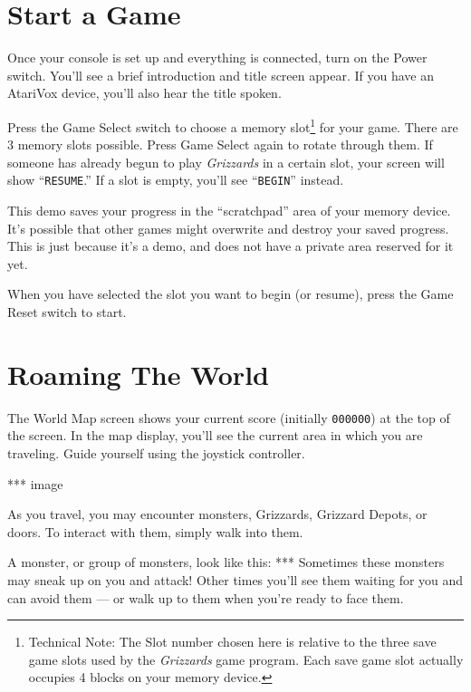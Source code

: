 \documentclass[12pt,openright,book]{memoir}
\begin{document}
\fi

\section{Start a Game}
Once your  console is set  up and everything  is connected, turn  on the
Power switch. You'll  see a brief introduction and  title screen appear.
If you have an AtariVox device, you'll also hear the title spoken.

Press the Game Select switch  to choose a memory slot\footnote{Technical
  Note: The Slot  number chosen here is relative to  the three save game
  slots used by the \textit{Grizzards} game program. Each save game slot
  actually  occupies 4  blocks on  your memory  device.} for  your game.
There are  3 memory slots  possible. Press  Game Select again  to rotate
through them. If someone has already begun to play \textit{Grizzards} in
a certain slot, your screen will  show ``\texttt{RESUME}.'' If a slot is
empty, you'll see ``\texttt{BEGIN}'' instead.

\ifdefined\DEMO
\skip
This  demo  saves your  progress  in  the  ``scratchpad'' area  of  your
memory  device.  It's possible  that  other  games might  overwrite  and
destroy your saved progress. This is  just because it's a demo, and does
not have a private area reserved for it yet.
\skip
\fi

When you have selected the slot you want to begin (or resume), press the
Game Reset switch to start.

\section{Roaming The World}

\ifdefined\TVNTSC \else  The World Map  screen shows your  current score
(initially \texttt{000000})  at the top  of the  screen. \fi In  the map
display,  you'll  see the  current  area  in  which you  are  traveling.
Guide yourself using the joystick controller.

*** image

As   you  travel,   you   may  encounter   monsters,\ifdefined\DEMO\else
Grizzards, \fi Grizzard Depots, or  doors. To interact with them, simply
walk into them.

A monster,  or group of  monsters, look  like this: ***  Sometimes these
monsters may  sneak up on  you and attack!  Other times you'll  see them
waiting for you  and can avoid them  --- or walk up to  them when you're
ready to face them.
\end{document}
